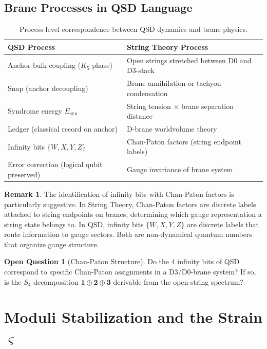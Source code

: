 \documentclass[11pt,a4paper]{article}
\theoremstyle{definition}
\newtheorem{remark}[theorem]{Remark}
\newtheorem{question}[theorem]{Open Question}
\newcommand{\strain}{\varsigma}            %
\newcommand{\Esyn}{E_{\mathrm{syn}}}
\begin{document}
\subsection{Brane Processes in QSD Language}

\begin{table}[h]
\centering
\begin{tabular}{p{5.5cm}p{5.5cm}}
\toprule
\textbf{QSD Process} & \textbf{String Theory Process} \\
\midrule
Anchor-bulk coupling ($K_5$ phase) & Open strings stretched between D0 and D3-stack \\[4pt]
Snap (anchor decoupling) & Brane annihilation or tachyon condensation \\[4pt]
Syndrome energy $\Esyn$ & String tension $\times$ brane separation distance \\[4pt]
Ledger (classical record on anchor) & D-brane worldvolume theory \\[4pt]
Infinity bits $\{W,X,Y,Z\}$ & Chan-Paton factors (string endpoint labels) \\[4pt]
Error correction (logical qubit preserved) & Gauge invariance of brane system \\
\bottomrule
\end{tabular}
\caption{Process-level correspondence between QSD dynamics and brane physics.}
\label{tab:brane_processes}
\end{table}

\begin{remark}
The identification of infinity bits with Chan-Paton factors is particularly
suggestive.  In String Theory, Chan-Paton factors are discrete labels attached
to string endpoints on branes, determining which gauge representation a string
state belongs to.  In QSD, infinity bits $\{W,X,Y,Z\}$ are discrete labels
that route information to gauge sectors.  Both are non-dynamical quantum
numbers that organize gauge structure.
\end{remark}

\begin{question}[Chan-Paton Structure]
Do the 4 infinity bits of QSD correspond to specific Chan-Paton assignments in
a D3/D0-brane system?  If so, is the $S_4$ decomposition
$\mathbf{1}\oplus\mathbf{2}\oplus\mathbf{3}$ derivable from the open-string
spectrum?
\end{question}


\section{Moduli Stabilization and the Strain $\strain$}
\label{sec:moduli}
\end{document}
